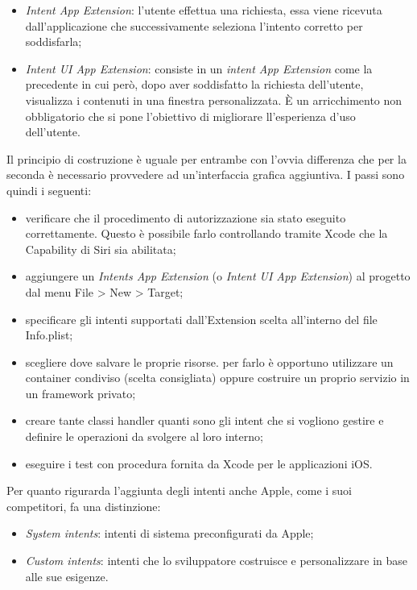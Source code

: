 		\begin{itemize}
			\item \textit{Intent App Extension}: l’utente effettua una richiesta, essa viene ricevuta dall’applicazione che successivamente seleziona l’intento corretto per soddisfarla;
			\item \textit{Intent UI App Extension}: consiste in un \textit{intent App Extension} come la precedente in cui però, dopo aver soddisfatto la richiesta dell’utente, visualizza i contenuti in una finestra personalizzata. È un arricchimento non obbligatorio che si pone l’obiettivo di migliorare ll'esperienza d'uso dell'utente.
		\end{itemize}
		Il principio di costruzione è uguale per entrambe con l'ovvia differenza che per la seconda è necessario provvedere ad un'interfaccia grafica aggiuntiva. I passi sono quindi i seguenti:
		\begin{itemize}
			\item verificare che il procedimento di autorizzazione sia stato eseguito correttamente. Questo è possibile farlo controllando tramite Xcode che la Capability di Siri sia abilitata;
			\item aggiungere un \textit{Intents App Extension} (o \textit{Intent UI App Extension}) al progetto dal menu File > New > Target;
			\item specificare gli intenti supportati dall’Extension scelta all’interno del file Info.plist;
			\item scegliere dove salvare le proprie risorse. per farlo è opportuno utilizzare un container condiviso (scelta consigliata) oppure costruire un proprio servizio in un framework privato;
			\item creare tante classi handler quanti sono gli intent che si vogliono gestire e definire le operazioni da svolgere al loro interno;
			\item eseguire i test con procedura fornita da Xcode per le applicazioni iOS.
		\end{itemize}
		Per quanto rigurarda l'aggiunta degli intenti anche Apple, come i suoi competitori, fa una distinzione:
		\begin{itemize}
			\item \textit{System intents}: intenti di sistema preconfigurati da Apple;
			\item \textit{Custom intents}: intenti che lo sviluppatore costruisce e personalizzare in base alle sue esigenze.
		\end{itemize}
		
